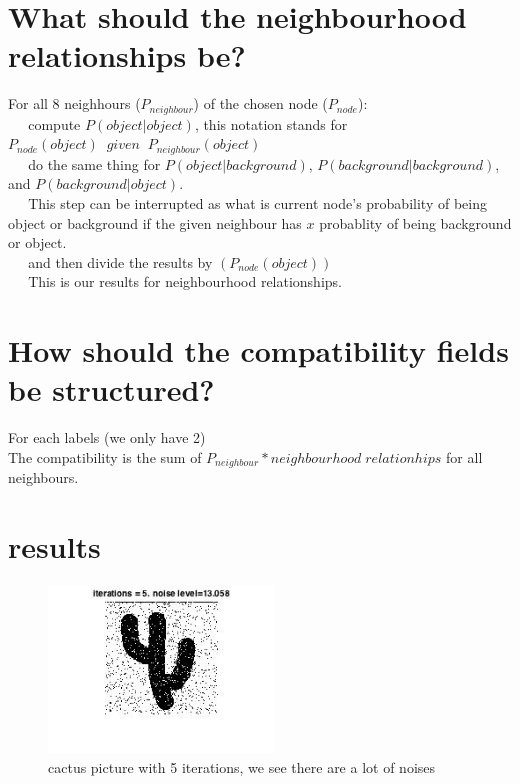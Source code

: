 \documentclass[twoside]{article}
\theoremstyle{definition}
\theoremstyle{definition}
\theoremstyle{remark}
\begin{document}
\section{What should the neighbourhood relationships be?}
For all 8 neighhours ($P_{neighbour}$) of the chosen node ($P_{node}$):\\

$\;\;\;\;$    compute $P(object|object)$, this notation stands for $P_{node}(object)\;\; given\;\; P_{neighbour}(object)$\\

$\;\;\;\;$     do the same thing for $P(object|background)$, $P(background|background)$, and $P(background|object)$. \\

$\;\;\;\;$     This step can be interrupted as what is current node's probability of being object or background if the given neighbour has $x$ probablity of being background or object.\\
    
$\;\;\;\;$     and then divide the results by $(P_{node}(object))$\\
    
$\;\;\;\;$     This is our results for neighbourhood relationships. \\

\section{How should the compatibility fields be structured?}
For each labels (we only have 2)\\
    The compatibility is the sum of $P_{neighbour} * neighbourhood\;relationhips$ for all neighbours.

\section{results}

\begin{figure}[H]
\centering
\includegraphics[width=60mm]{5_cactus.jpg}
\caption{cactus picture with 5 iterations, we see there are a lot of noises}
\end{figure}
\end{document}
